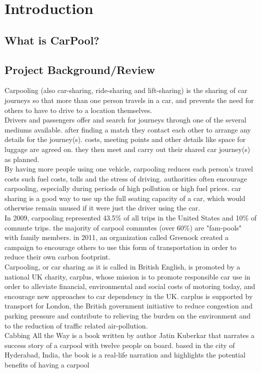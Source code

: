 \chapter{Introduction} \label{chap:intro}

\section*{What is CarPool?}

\section{Project Background/Review}
\justify
Carpooling (also car-sharing, ride-sharing and lift-sharing) is the sharing of car journeys so that more than one person travels in a car, and prevents the need for others to have to drive to a location themselves.
\\ Drivers and passengers offer and search for journeys through one of the several mediums available. after finding a match they contact each other to arrange any details for the journey(s). costs, meeting points and other details like space for luggage are agreed on. they then meet and carry out their shared car journey(s) as planned.
\\ By having more people using one vehicle, carpooling reduces each person's travel costs such fuel costs, tolls and the stress of driving. authorities often encourage carpooling, especially during periods of high pollution or high fuel prices. car sharing is a good way to use up the full seating capacity of a car, which would otherwise remain unused if it were just the driver using the car.
\\ In 2009, carpooling represented 43.5\% of all trips in the United States and 10\% of commute trips. the majority of carpool commutes (over 60\%) are "fam-pools" with family members. in 2011, an organization called Greenock created a campaign to encourage others to use this form of transportation in order to reduce their own carbon footprint.
\\ Carpooling, or car sharing as it is called in British English, is promoted by a national UK charity, carplus, whose mission is to promote responsible car use in order to alleviate financial, environmental and social costs of motoring today, and encourage new approaches to car dependency in the UK. carplus is supported by transport for London, the British government initiative to reduce congestion and parking pressure and contribute to relieving the burden on the environment and to the reduction of traffic related air-pollution.
\\ Cabbing All the Way is a book written by author Jatin Kuberkar that narrates a success story of a carpool with twelve people on board. based in the city of Hyderabad, India, the book is a real-life narration and highlights the potential benefits of having a carpool

